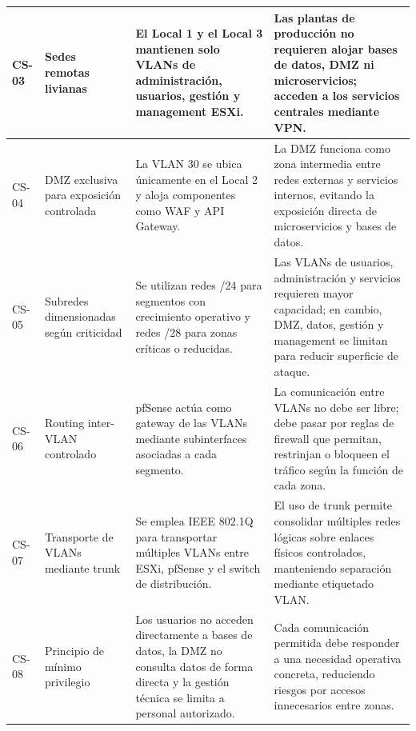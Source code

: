 \documentclass[11pt, a4paper, oneside]{report}
\begin{document}
\begin{xltabular}{\textwidth}{@{}|N{1.5cm}|L{3.8cm}|X|X|@{}}
{\small CS-03} &
{\small Sedes remotas livianas} &
{\small El Local 1 y el Local 3 mantienen solo VLANs de administración, usuarios, gestión y management ESXi.} &
{\small Las plantas de producción no requieren alojar bases de datos, DMZ ni microservicios; acceden a los servicios centrales mediante VPN.} \\ \hline

{\small CS-04} &
{\small DMZ exclusiva para exposición controlada} &
{\small La VLAN 30 se ubica únicamente en el Local 2 y aloja componentes como WAF y API Gateway.} &
{\small La DMZ funciona como zona intermedia entre redes externas y servicios internos, evitando la exposición directa de microservicios y bases de datos.} \\ \hline

{\small CS-05} &
{\small Subredes dimensionadas según criticidad} &
{\small Se utilizan redes /24 para segmentos con crecimiento operativo y redes /28 para zonas críticas o reducidas.} &
{\small Las VLANs de usuarios, administración y servicios requieren mayor capacidad; en cambio, DMZ, datos, gestión y management se limitan para reducir superficie de ataque.} \\ \hline

{\small CS-06} &
{\small Routing inter-VLAN controlado} &
{\small pfSense actúa como gateway de las VLANs mediante subinterfaces asociadas a cada segmento.} &
{\small La comunicación entre VLANs no debe ser libre; debe pasar por reglas de firewall que permitan, restrinjan o bloqueen el tráfico según la función de cada zona.} \\ \hline

{\small CS-07} &
{\small Transporte de VLANs mediante trunk} &
{\small Se emplea IEEE 802.1Q para transportar múltiples VLANs entre ESXi, pfSense y el switch de distribución.} &
{\small El uso de trunk permite consolidar múltiples redes lógicas sobre enlaces físicos controlados, manteniendo separación mediante etiquetado VLAN.} \\ \hline

{\small CS-08} &
{\small Principio de mínimo privilegio} &
{\small Los usuarios no acceden directamente a bases de datos, la DMZ no consulta datos de forma directa y la gestión técnica se limita a personal autorizado.} &
{\small Cada comunicación permitida debe responder a una necesidad operativa concreta, reduciendo riesgos por accesos innecesarios entre zonas.} \\ \hline

\end{xltabular}
\end{document}
